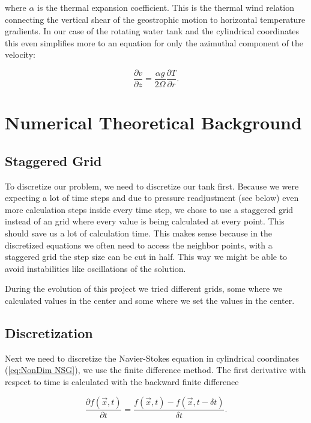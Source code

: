 \documentclass[12pt, a4paper, twoside]{article}
\begin{document}
		where $\alpha$ is the thermal expansion coefficient. This is the thermal wind relation connecting the vertical shear of the geostrophic motion to horizontal temperature gradients. In our case of the rotating water tank and the cylindrical coordinates this even simplifies more to an equation for only the azimuthal component of the velocity:
		
		\begin{equation}
			\frac{\partial v}{\partial z} = \frac{\alpha g}{2\Omega} \frac{\partial T}{\partial r} .
			\label{eq:Thermal Wind}
		\end{equation}
		
	\newpage		
\section{Numerical Theoretical Background}
	\subsection{Staggered Grid}
		To discretize our problem, we need to discretize our tank first. Because we were expecting a lot of time steps and due to pressure readjustment (see below) even more calculation steps inside every time step, we chose to use a staggered grid instead of an grid where every value is being calculated at every point. This should save us a lot of calculation time. This makes sense because in the discretized equations we often need to access the neighbor points, with a staggered grid the step size can be cut in half. This way we might be able to avoid instabilities like oscillations of the solution. 
		
		During the evolution of this project we tried different grids, some where we calculated values in the center and some where we set the values in the center. %
		
		
	\subsection{Discretization}
		Next we need to discretize the Navier-Stokes equation in cylindrical coordinates (\ref{eq:NonDim NSG}), we use the finite difference method. The first derivative with respect to time is calculated with the backward finite difference
		
		\begin{equation}
			\frac{\partial f(\vec{x}, t)}{\partial t} = \frac{f(\vec{x},t) - f(\vec{x}, t - \delta t)}{\delta t} .
			\label{eq:BackDiv Time}
		\end{equation}
		
\end{document}
